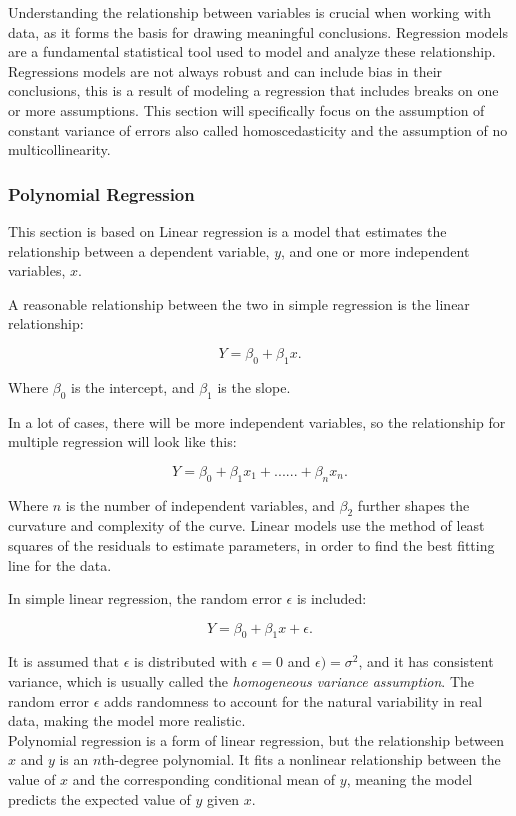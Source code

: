 Understanding the relationship between variables is crucial when working with data, as it forms the basis for drawing meaningful conclusions. Regression models are a fundamental statistical tool used to model and analyze these relationship. Regressions models are not always robust and can include bias in their conclusions, this is a result of modeling a regression that includes breaks on one or more assumptions. This section will specifically focus on the assumption of constant variance of errors also called homoscedasticity and the assumption of no multicollinearity.

\subsubsection{Polynomial Regression}
This section is based on 
Linear regression is a model that estimates the relationship between a dependent variable, \( y \), and one or more independent variables, \( x \).

\noindent A reasonable relationship between the two in simple regression is the linear relationship:

\[
Y = \beta_0 + \beta_1 x .
\]

\noindent Where \( \beta_0 \) is the intercept, and \( \beta_1 \) is the slope.

\noindent In a lot of cases, there will be more independent variables, so the relationship for multiple regression will look like this:

\[
Y = \beta_0 + \beta_1 x_1 + ......+ \beta_n x_n .
\]



\noindent Where \( n \) is the number of independent variables, and $\beta_2$ further shapes the curvature and complexity of the curve. Linear models use the method of least squares of the residuals to estimate parameters, in order to find the best fitting line for the data.

\noindent In simple linear regression, the random error \( \epsilon \) is included:

\[
Y = \beta_0 + \beta_1 x + \epsilon .
\]

\noindent It is assumed that \( \epsilon \) is distributed with $\epsilon = 0$ and $\epsilon) = \sigma^2$, and it has consistent variance, which is usually called the \textit{homogeneous variance assumption}. The random error \( \epsilon \) adds randomness to account for the natural variability in real data, making the model more realistic.
\newline\\
Polynomial regression is a form of linear regression, but the relationship between \( x \) and \( y \) is an \( n \)th-degree polynomial. It fits a nonlinear relationship between the value of \( x \) and the corresponding conditional mean of \( y \), meaning the model predicts the expected value of \( y \) given \( x \). \newline

